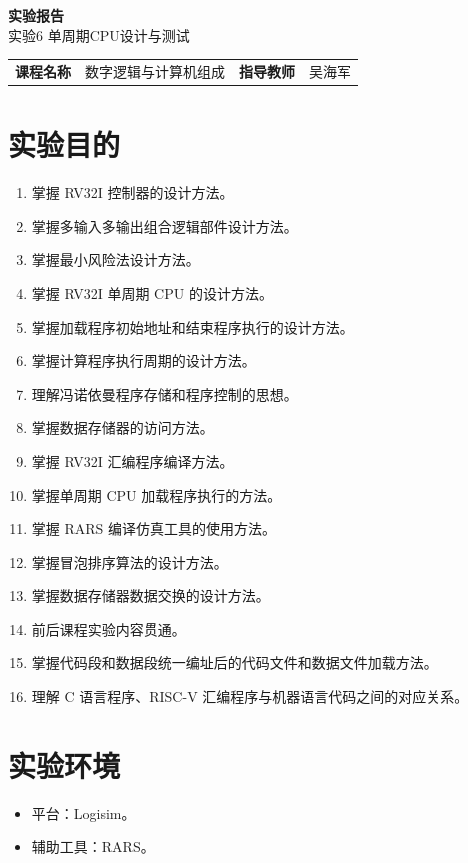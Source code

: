 \documentclass[UTF8,a4paper,11pt]{ctexart}
\newcommand{\placeholder}[1]{
\begin{tcolorbox}[colback=sub,colframe=main,boxrule=0.6pt,arc=2mm,left=2mm,right=2mm,top=1mm,bottom=1mm]
#1
\end{tcolorbox}
}
\begin{document}
\begin{center}
{\Huge\bfseries 实验报告}\\[0.8em]
{\LARGE 实验6 单周期CPU设计与测试}\\[1.2em]
\end{center}

\begin{tcolorbox}[colback=white,colframe=main,boxrule=0.8pt,arc=2mm]
\renewcommand{\arraystretch}{1.6}
\begin{tabularx}{\textwidth}{>{\bfseries}p{2.6cm}X >{\bfseries}p{2.6cm}X}
课程名称 & 数字逻辑与计算机组成 & 指导教师 & 吴海军 \\
\end{tabularx}
\end{tcolorbox}

\section{实验目的}
\placeholder{\begin{enumerate}
\item 掌握 RV32I 控制器的设计方法。
\item 掌握多输入多输出组合逻辑部件设计方法。
\item 掌握最小风险法设计方法。
\item 掌握 RV32I 单周期 CPU 的设计方法。
\item 掌握加载程序初始地址和结束程序执行的设计方法。
\item 掌握计算程序执行周期的设计方法。
\item 理解冯诺依曼程序存储和程序控制的思想。
\item 掌握数据存储器的访问方法。
\item 掌握 RV32I 汇编程序编译方法。
\item 掌握单周期 CPU 加载程序执行的方法。
\item 掌握 RARS 编译仿真工具的使用方法。
\item 掌握冒泡排序算法的设计方法。
\item 掌握数据存储器数据交换的设计方法。
\item 前后课程实验内容贯通。
\item 掌握代码段和数据段统一编址后的代码文件和数据文件加载方法。
\item 理解 C 语言程序、RISC-V 汇编程序与机器语言代码之间的对应关系。
\end{enumerate}}

\section{实验环境}
\placeholder{\begin{itemize}
\item 平台：Logisim。
\item 辅助工具：RARS。
\end{itemize}}
\end{document}
